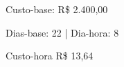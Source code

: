 \documentclass[
    12pt,               %
    openright,          %
    oneside,
    a4paper,            %
    BIBLATEX,           %
    TODO,               %
    english,            %
    brazil              %
    ]{ifsp-spo-inf-ctds}
\begin{document}
            \item Custo-base: R\$ 2.400,00
            \item Dias-base: 22 | Dia-hora: 8
            \item Custo-hora R\$ 13,64

        

                
\end{document}
